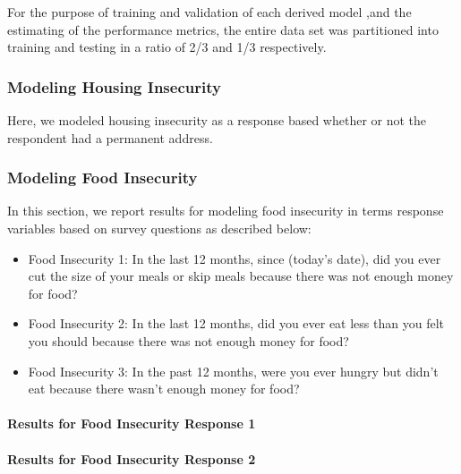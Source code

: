 \documentclass[
  10pt,
]{article}
\begin{document}
For the purpose of training and validation of each derived model ,and the estimating of the performance metrics, the entire data set was partitioned into training and testing in a ratio of 2/3 and 1/3 respectively.

\hypertarget{modeling-housing-insecurity}{%
\subsubsection{Modeling Housing Insecurity}\label{modeling-housing-insecurity}}

Here, we modeled housing insecurity as a response based whether or not the respondent had a permanent address.

\hypertarget{modeling-food-insecurity}{%
\subsubsection{Modeling Food Insecurity}\label{modeling-food-insecurity}}

In this section, we report results for modeling food insecurity in terms response variables based on survey questions as described below:

\begin{itemize}
\item
  Food Insecurity 1: In the last 12 months, since (today's date), did you ever cut the size of your meals or skip meals because there was not enough money for food?
\item
  Food Insecurity 2: In the last 12 months, did you ever eat less than you felt you should because there was not enough money for food?
\item
  Food Insecurity 3: In the past 12 months, were you ever hungry but didn't eat because there wasn't enough money for food?
\end{itemize}

\hypertarget{results-for-food-insecurity-response-1}{%
\paragraph{Results for Food Insecurity Response 1}\label{results-for-food-insecurity-response-1}}

\hypertarget{results-for-food-insecurity-response-2}{%
\paragraph{Results for Food Insecurity Response 2}\label{results-for-food-insecurity-response-2}}
\end{document}
